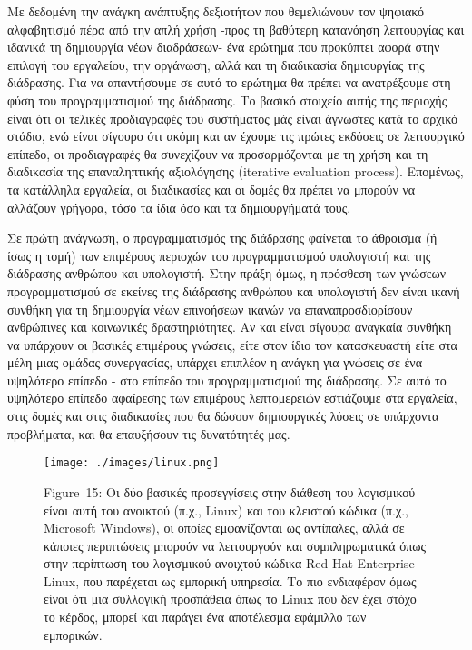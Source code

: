 \documentclass[
]{article}
\begin{document}
Με δεδομένη την ανάγκη ανάπτυξης δεξιοτήτων που θεμελιώνουν τον ψηφιακό
αλφαβητισμό πέρα από την απλή χρήση -προς τη βαθύτερη κατανόηση
λειτουργίας και ιδανικά τη δημιουργία νέων διαδράσεων- ένα ερώτημα που
προκύπτει αφορά στην επιλογή του εργαλείου, την οργάνωση, αλλά και τη
διαδικασία δημιουργίας της διάδρασης. Για να απαντήσουμε σε αυτό το
ερώτημα θα πρέπει να ανατρέξουμε στη φύση του προγραμματισμού της
διάδρασης. Το βασικό στοιχείο αυτής της περιοχής είναι ότι οι τελικές
προδιαγραφές του συστήματος μάς είναι άγνωστες κατά το αρχικό στάδιο,
ενώ είναι σίγουρο ότι ακόμη και αν έχουμε τις πρώτες εκδόσεις σε
λειτουργικό επίπεδο, οι προδιαγραφές θα συνεχίζουν να προσαρμόζονται με
τη χρήση και τη διαδικασία της επαναληπτικής αξιολόγησης (iterative
evaluation process). Επομένως, τα κατάλληλα εργαλεία, οι διαδικασίες και
οι δομές θα πρέπει να μπορούν να αλλάζουν γρήγορα, τόσο τα ίδια όσο και
τα δημιουργήματά τους.

Σε πρώτη ανάγνωση, ο προγραμματισμός της διάδρασης φαίνεται το άθροισμα
(ή ίσως η τομή) των επιμέρους περιοχών του προγραμματισμού υπολογιστή
και της διάδρασης ανθρώπου και υπολογιστή. Στην πράξη όμως, η πρόσθεση
των γνώσεων προγραμματισμού σε εκείνες της διάδρασης ανθρώπου και
υπολογιστή δεν είναι ικανή συνθήκη για τη δημιουργία νέων επινοήσεων
ικανών να επαναπροσδιορίσουν ανθρώπινες και κοινωνικές δραστηριότητες.
Αν και είναι σίγουρα αναγκαία συνθήκη να υπάρχουν οι βασικές επιμέρους
γνώσεις, είτε στον ίδιο τον κατασκευαστή είτε στα μέλη μιας ομάδας
συνεργασίας, υπάρχει επιπλέον η ανάγκη για γνώσεις σε ένα υψηλότερο
επίπεδο - στο επίπεδο του προγραμματισμού της διάδρασης. Σε αυτό το
υψηλότερο επίπεδο αφαίρεσης των επιμέρους λεπτομερειών εστιάζουμε στα
εργαλεία, στις δομές και στις διαδικασίες που θα δώσουν δημιουργικές
λύσεις σε υπάρχοντα προβλήματα, και θα επαυξήσουν τις δυνατότητές μας.

\leavevmode{}%
\begin{figure}
\hypertarget{fig:linux}{%
\centering
\texttt{[image: ./images/linux.png]}
\caption{Figure~15: Οι δύο βασικές προσεγγίσεις στην διάθεση του
λογισμικού είναι αυτή του ανοικτού (π.χ., Linux) και του κλειστού κώδικα
(π.χ., Microsoft Windows), οι οποίες εμφανίζονται ως αντίπαλες, αλλά σε
κάποιες περιπτώσεις μπορούν να λειτουργούν και συμπληρωματικά όπως στην
περίπτωση του λογισμικού ανοιχτού κώδικα Red Hat Enterprise Linux, που
παρέχεται ως εμπορική υπηρεσία. Το πιο ενδιαφέρον όμως είναι ότι μια
συλλογική προσπάθεια όπως το Linux που δεν έχει στόχο το κέρδος, μπορεί
και παράγει ένα αποτέλεσμα εφάμιλλο των εμπορικών.}\label{fig:linux}
}
\end{figure}
\end{document}
